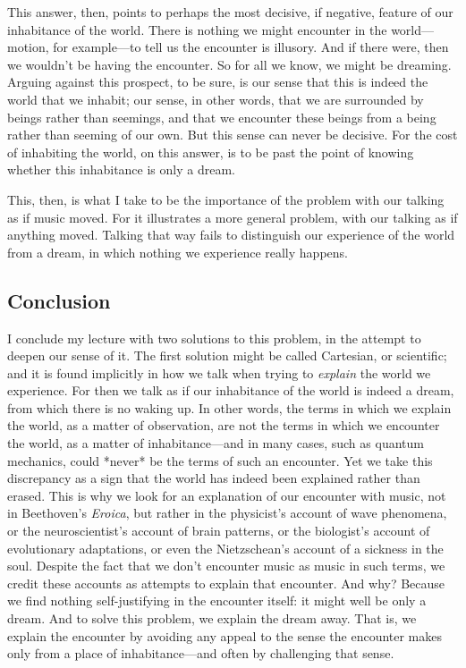 \documentclass[12pt]{memoir}
\begin{document}
This answer, then, points to perhaps the most
decisive, if negative, feature of our inhabitance
of the world. There is nothing we might encounter
in the world---motion, for example---to tell us
the encounter is illusory. And if there were, then
we wouldn't be having the encounter. So for all
we know, we might be dreaming. Arguing against
this prospect, to be sure, is our sense that this
is indeed the world that we inhabit; our sense,
in other words, that we are surrounded by beings
rather than seemings, and that we encounter these
beings from a being rather than seeming of our
own. But this sense can never be decisive. For
the cost of inhabiting the world, on this answer,
is to be past the point of knowing whether this
inhabitance is only a dream.

This, then, is what I take to be the importance of
the problem with our talking as if music moved.
For it illustrates a more general problem, with
our talking as if anything moved. Talking that
way fails to distinguish our experience of the
world from a dream, in which nothing we experience
really happens.

\subsection{Conclusion}

I conclude my lecture with two solutions to this
problem, in the attempt to deepen our sense of it.
The first solution might be called Cartesian, or
scientific; and it is found implicitly in how we
talk when trying to \emph{explain} the world we
experience. For then we talk as if our inhabitance
of the world is indeed a dream, from which there
is no waking up. In other words, the terms in
which we explain the world, as a matter of
observation, are not the terms in which we
encounter the world, as a matter of
inhabitance---and in many cases, such as quantum
mechanics, could *never* be the terms of such an
encounter. Yet we take this discrepancy as
a sign that the world has indeed been explained rather
than erased. This is why we look for an
explanation of our encounter with music, not in
Beethoven's \emph{Eroica}, but rather in the
physicist's account of wave phenomena, or the
neuroscientist's account of brain patterns, or the
biologist's account of evolutionary adaptations,
or even the Nietzschean's account of a sickness in
the soul. Despite the fact that we don't encounter
music as music in such terms, we credit these
accounts as attempts to explain that encounter.
And why? Because we find nothing self-justifying
in the encounter itself: it might well be only a
dream. And to solve this problem, we explain the
dream away. That is, we explain the encounter by
avoiding any appeal to the sense the encounter
makes only from a place of inhabitance---and often
by challenging that sense.
\end{document}
